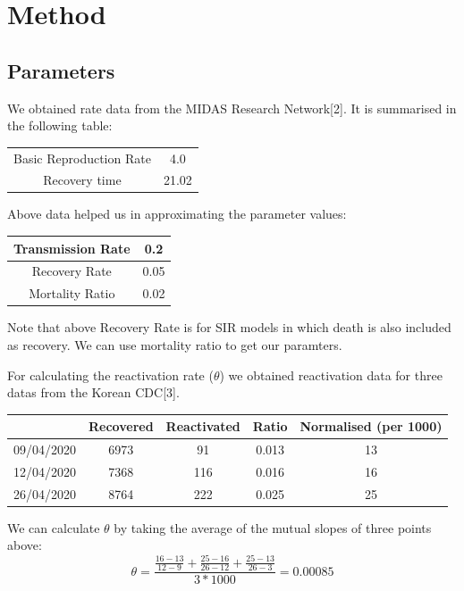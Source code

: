 \documentclass{article}
\begin{document}
	\section{Method}
	\subsection{Parameters}
	We obtained rate data from the MIDAS Research Network[2]. It is summarised in the following table:
	\begin{center}
		\begin{tabular}{ |c|c| } 
		 \hline
		 & \\
		 \hline
		 Basic Reproduction Rate & 4.0 \\ 
		 \hline
		 Recovery time & 21.02 \\ 
		 \hline
		\end{tabular}
	\end{center}

	Above data helped us in approximating the parameter values:
	\begin{center}
		\begin{tabular}{ |c|c| } 
		 \hline
		 Transmission Rate & 0.2 \\ 
		 \hline
		 Recovery Rate & 0.05 \\
		 \hline
		 Mortality Ratio & 0.02\\ 
		 \hline
		\end{tabular}
	\end{center}

	Note that above Recovery Rate is for SIR models in which death is also included as recovery. We can use mortality ratio to get our paramters.


	For calculating the reactivation rate ($\theta$) we obtained reactivation data for three datas from the Korean CDC[3].
	\begin{center}
		\begin{tabular}{ |c|c|c|c|c| } 
		 \hline
		  & Recovered & Reactivated & Ratio & Normalised (per 1000) \\ 
		 \hline
		 09/04/2020 & 6973 & 91 & 0.013 & 13 \\ 
		 \hline
		 12/04/2020 & 7368 & 116 & 0.016 & 16\\ 
		 \hline
		 26/04/2020 & 8764 & 222 & 0.025 & 25\\
		 \hline
		\end{tabular}
	\end{center}

	We can calculate $\theta$ by taking the average of the mutual slopes of three points above:
	\begin{equation*}
		\theta = \frac{\frac{16-13}{12-9} + \frac{25-16}{26-12} + \frac{25-13}{26-3}}{3*1000} = 0.00085
	\end{equation*}
	
\end{document}
